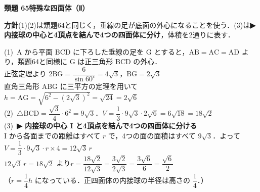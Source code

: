 \documentclass[a4paper,11pt]{ltjsarticle}
\newcommand{\ans}[2]{\Needspace{5\baselineskip}\vspace{6pt}%
  {\sffamily\bfseries 類題 #1\quad #2}\par}
\newcommand{\point}[1]{\textsf{\bfseries ▶ #1}}
\begin{document}
\ans{65}{特殊な四面体（Ⅱ）}
\begin{kai}
\textbf{方針}\quad (1)(2)は類題64と同じく，垂線の足が底面の外心になることを使う．(3)は\point{内接球の中心と4頂点を結んで4つの四面体に分け}，体積を2通りに表す．\\[2pt]
\begin{center}
\end{center}
(1)\ A から平面 BCD に下ろした垂線の足を G とすると，$\mathrm{AB}=\mathrm{AC}=\mathrm{AD}$ より，類題64と同様に G は正三角形 BCD の外心．\\
\hspace*{1.5em}正弦定理より $2\mathrm{BG}=\dfrac{6}{\sin60^\circ}=4\sqrt3$，\quad $\mathrm{BG}=2\sqrt3$\\
\hspace*{1.5em}直角三角形 ABG に三平方の定理を用いて\quad $h=\mathrm{AG}=\sqrt{6^2-(2\sqrt3)^2}=\sqrt{24}=2\sqrt6$\\[2pt]
(2)\ $\triangle\mathrm{BCD}=\dfrac{\sqrt3}4\cdot6^2=9\sqrt3$．\quad $V=\dfrac13\cdot9\sqrt3\cdot2\sqrt6=6\sqrt{18}=18\sqrt2$\\[2pt]
(3)\ \point{内接球の中心 I と4頂点を結んで4つの四面体に分ける}\\
\hspace*{1.5em}I から各面までの距離はすべて $r$ で，4つの面の面積はすべて $9\sqrt3$．よって\\
\hspace*{1.5em}$V=\dfrac13\cdot9\sqrt3\cdot r\times4=12\sqrt3\,r$\\
\hspace*{1.5em}$12\sqrt3\,r=18\sqrt2$ より\quad $r=\dfrac{18\sqrt2}{12\sqrt3}=\dfrac{3\sqrt2}{2\sqrt3}=\dfrac{3\sqrt6}{6}=\dfrac{\sqrt6}{2}$\\
\hspace*{1.5em}（$r=\dfrac14h$ になっている．正四面体の内接球の半径は高さの $\dfrac14$．）
\end{kai}
\end{document}
